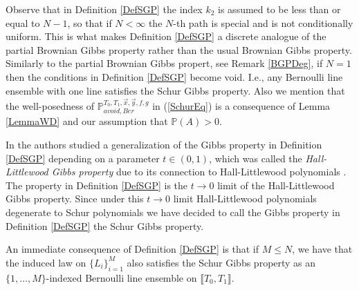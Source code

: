 \begin{remark}\label{RemSGB2} Observe that in Definition \ref{DefSGP} the index $k_2$ is assumed to be less than or equal to $N-1$, so that if $N < \infty$ the $N$-th path is special and is not conditionally uniform. This is what makes Definition \ref{DefSGP} a discrete analogue of the partial Brownian Gibbs property rather than the usual Brownian Gibbs property. Similarly to the partial Brownian Gibbs propert, see Remark \ref{BGPDeg}, if $N = 1$ then the conditions in Definition \ref{DefSGP} become void. I.e., any Bernoulli line ensemble with one line satisfies the Schur Gibbs property. Also we mention that the well-posedness of $\mathbb{P}_{avoid, Ber}^{T_0,T_1, \vec{x}, \vec{y}, f, g}$ in (\ref{SchurEq}) is a consequence of Lemma \ref{LemmaWD} and our assumption that $\mathbb{P}(A) > 0$.
\end{remark}

\begin{remark} In \cite{CD} the authors studied a generalization of the Gibbs property in Definition \ref{DefSGP} depending on a parameter $t \in (0,1)$, which was called the {\em Hall-Littlewood Gibbs property} due to its connection to Hall-Littlewood polynomials \cite{Mac}. The property in Definition \ref{DefSGP} is the $t \rightarrow 0$ limit of the Hall-Littlewood Gibbs property. Since under this $t \rightarrow 0$ limit Hall-Littlewood polynomials degenerate to Schur polynomials we have decided to call the Gibbs property in Definition \ref{DefSGP} the Schur Gibbs property.
\end{remark}
\begin{remark} \label{restrict}  An immediate consequence of Definition \ref{DefSGP} is that if $M \leq N$, we have that the induced law on $\{L_i\}_{i = 1}^M$ also satisfies the Schur Gibbs property as an $\{1,\dots,M\}$-indexed Bernoulli line ensemble on $\llbracket T_0, T_1 \rrbracket$.
\end{remark}

